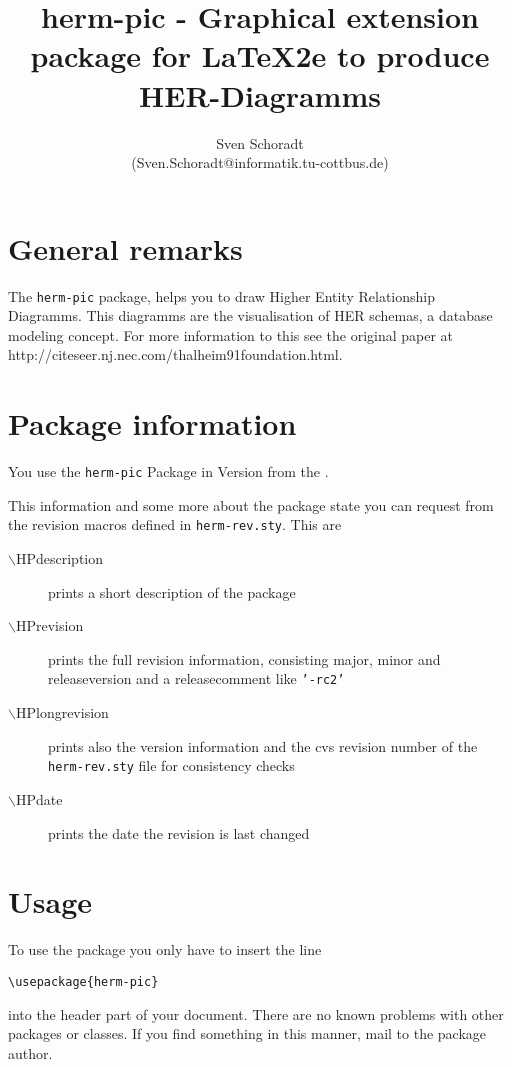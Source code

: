 \documentclass[a4paper,11pt]{article}
\author{Sven Schoradt \\ (Sven.Schoradt@informatik.tu-cottbus.de)}
\title{herm-pic - Graphical extension package for LaTeX2e to produce HER-Diagramms}
\begin{document}
\maketitle

\section{General remarks}

The {\tt herm-pic} package, helps you to draw Higher Entity Relationship Diagramms.
This diagramms are the visualisation of HER schemas, a database modeling 
concept. For more information to this see the original paper at 
http://citeseer.nj.nec.com/thalheim91foundation.html.

\section{Package information}

You use the {\tt herm-pic} Package in Version \HPlongrevision{} from the \HPdate.

This information and some more about the package state you can request from the 
revision macros defined in {\tt herm-rev.sty}. This are

\begin{description}
\item[$\backslash{}$HPdescription] prints a short description of the package
\item[$\backslash{}$HPrevision] prints the full revision information, consisting major, minor and releaseversion
  and a releasecomment like {\tt '-rc2'}
\item[$\backslash{}$HPlongrevision] prints also the version information and the cvs revision number of the 
  {\tt herm-rev.sty} file for consistency checks
\item[$\backslash{}$HPdate] prints the date the revision is last changed
\end{description}

\section{Usage}

To use the package you only have to insert the line

\begin{verbatim}
\usepackage{herm-pic}
\end{verbatim}

into the header part of your document. There are no known problems with other
packages or classes. If you find something in this manner, mail to the package 
author.
\end{document}
